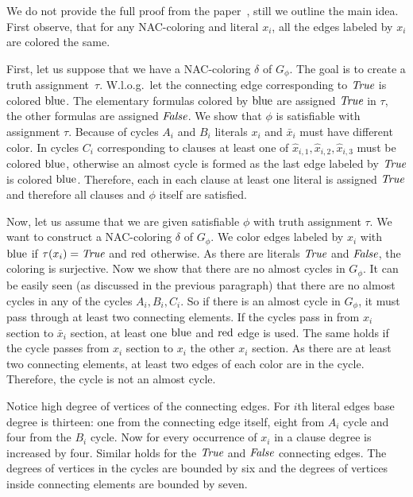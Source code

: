 We do not provide the full proof from the paper~\cite{np_complete},
still we outline the main idea.
First observe, that for any NAC-coloring and literal \( x_i \),
all the edges labeled by \( x_i \) are colored the same.

First, let us suppose that we have a NAC-coloring \( \delta \) of \( G_\phi \).
The goal is to create a truth assignment~\( \tau \).
W.l.o.g.\ let the connecting edge corresponding to \( \textit{True} \) is colored \( \text{blue} \).
The elementary formulas colored by \( \text{blue} \) are assigned \( \textit{True} \) in \( \tau \),
the other formulas are assigned \( \textit{False} \).
We show that \( \phi \) is satisfiable with assignment \( \tau \).
Because of cycles \( A_i \) and \( B_i \) literals \( x_i \) and \( \bar{x}_i \)
must have different color. In cycles \( C_i \) corresponding to clauses
at least one of \( \hat{x}_{i,1}, \hat{x}_{i,2}, \hat{x}_{i,3} \) must be colored \( \text{blue} \),
otherwise an almost cycle is formed as the last edge labeled by \( \textit{True} \) is colored \( \text{blue} \).
Therefore, each in each clause at least one literal is assigned \( \textit{True} \)
and therefore all clauses and \( \phi \) itself are satisfied.

Now, let us assume that we are given satisfiable \( \phi \)
with truth assignment \( \tau \).
We want to construct a NAC-coloring \( \delta \) of \( G_\phi \).
We color edges labeled by \( x_i \) with \( \text{blue} \) if \( \tau(x_i) = \textit{True} \)
and \( \text{red} \) otherwise.
As there are literals \( \textit{True} \) and \( \textit{False} \), the coloring is surjective.
Now we show that there are no almost cycles in \( G_\phi \).
It can be easily seen (as discussed in the previous paragraph)
that there are no almost cycles in any of the cycles \( A_i, B_i, C_i \).
So if there is an almost cycle in \( G_\phi \), it must pass through
at least two connecting elements.
If the cycles pass in 
from \( x_i \) section to \( \bar{x}_i \) section, at least one \( \text{blue} \)
and \( \text{red} \) edge is used. The same holds if the cycle passes
from \( x_i \) section to \( x_i \) the other \( x_i \) section.
As there are at least two connecting elements, at least two edges of each color are in the cycle.
Therefore, the cycle is not an almost cycle.

Notice high degree of vertices of the connecting edges.
For \( i \)th literal edges base degree is thirteen: one from the connecting edge itself,
eight from \( A_i \) cycle and four from the \( B_i \) cycle.
Now for every occurrence of \( x_i \) in a clause degree is increased by four.
Similar holds for the \( \textit{True} \) and \( \textit{False} \) connecting edges.
The degrees of vertices in the cycles are bounded by six
and the degrees of vertices inside connecting elements are bounded by seven.


